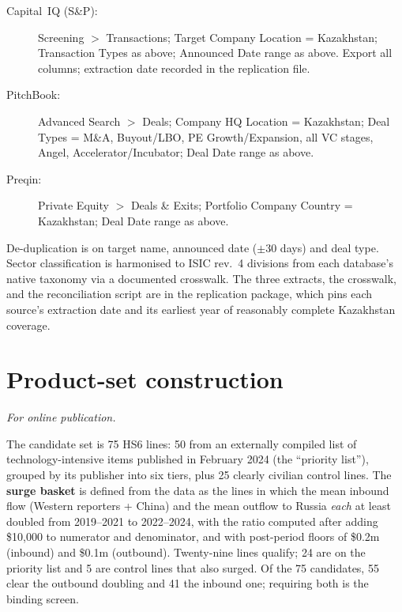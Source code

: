\documentclass[12pt]{article}
\begin{document}
\begin{description}
\item[Capital~IQ (S\&P):] Screening $>$ Transactions; Target Company Location = Kazakhstan;
Transaction Types as above; Announced Date range as above. Export all columns; extraction date
recorded in the replication file.
\item[PitchBook:] Advanced Search $>$ Deals; Company HQ Location = Kazakhstan; Deal Types =
M\&A, Buyout\slash LBO, PE Growth\slash Expansion, all VC stages, Angel,
Accelerator\slash Incubator; Deal Date range as above.
\item[Preqin:] Private Equity $>$ Deals \& Exits; Portfolio Company Country = Kazakhstan; Deal
Date range as above.
\end{description}

De-duplication is on target name, announced date ($\pm$30 days) and deal type. Sector
classification is harmonised to ISIC rev.~4 divisions from each database's native taxonomy via
a documented crosswalk. The three extracts, the crosswalk, and the reconciliation script are
in the replication package, which pins each source's extraction date and its earliest year of
reasonably complete Kazakhstan coverage.

\section{Product-set construction}\label{app:products}
\emph{For online publication.}

\medskip
The candidate set is 75 HS6 lines: 50 from an externally compiled list of technology-intensive
items published in February 2024 (the ``priority list''), grouped by its publisher into six
tiers, plus 25 clearly civilian control lines. The \textbf{surge basket} is defined from the
data as the lines in which the mean inbound flow (Western reporters + China) and the mean
outflow to Russia \emph{each} at least doubled from 2019--2021 to 2022--2024, with the ratio
computed after adding \$10{,}000 to numerator and denominator, and with post-period floors of
\$0.2m (inbound) and \$0.1m (outbound). Twenty-nine lines qualify; 24 are on the priority list
and 5 are control lines that also surged. Of the 75 candidates, 55 clear the outbound doubling
and 41 the inbound one; requiring both is the binding screen.
\end{document}
